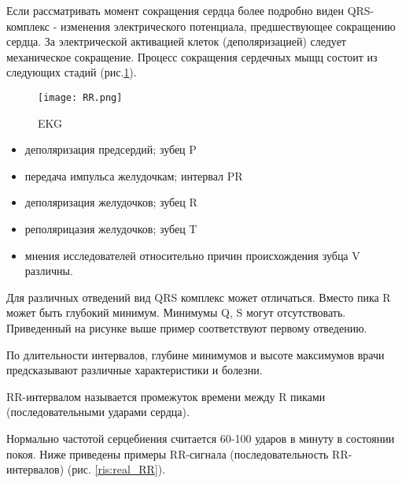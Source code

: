 Если рассматривать момент сокращения сердца более подробно \cite{polarization_heart} виден QRS-комплекс - изменения электрического потенциала, предшествующее сокращению сердца. За электрической активацией клеток (деполяризацией) следует механическое сокращение. Процесс сокращения сердечных мыщц состоит из следующих стадий (рис.\ref{ris:EKG}).

\begin{figure}[h!]
	\begin{center}
		\texttt{[image: RR.png]}
		\caption{EKG}
		\label{ris:EKG}
	\end{center}
\end{figure}

\begin{itemize}
	\item деполяризация предсердий; зубец P
	\item передача импульса желудочкам; интервал PR
	\item деполяризация желудочков; зубец R
	\item реполярицазия желудочков; зубец T
	\item мнения исследователей относительно причин происхождения зубца V различны.
\end{itemize}

Для различных отведений вид QRS комплекс может отличаться. Вместо пика R может быть глубокий минимум. Минимумы Q, S могут отсутствовать. Приведенный на рисунке выше пример соответствуют первому отведению.

По длительности интервалов, глубине минимумов и высоте максимумов врачи предсказывают различные характеристики и болезни.

RR-интервалом называется промежуток времени между R пиками (последовательными ударами сердца).


Нормально частотой серцебиения считается 60-100 ударов в минуту в состоянии покоя. Ниже приведены примеры RR-сигнала (последовательность RR-интервалов) (рис. \ref{ris:real_RR}).

